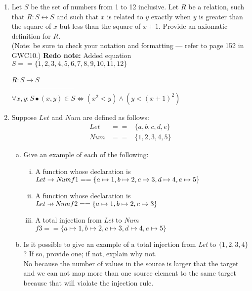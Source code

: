 \documentclass{article}
\renewcommand{\iff}{\Leftrightarrow}
\newcommand{\define}{==}
\begin{document}
\begin{enumerate}[\bf I.]
\begin{enumerate}[1.]
\item Let $S$ be the set of numbers from 1 to 12 inclusive. Let $R$ be a relation, such that
$R:S\leftrightarrow S$ and such that $x$ is related to $y$ exactly when
$y$ is greater than the square of $x$ but less than the square of
$x+1$. Provide an axiomatic definition for $R$. \\
(Note: be sure to check your notation and formatting --- refer to page 152 in GWC10.)
  \textbf{Redo note:} Added equation  \\
  $S == \{1,2,3,4,5,6,7,8,9,10,11,12\}$ \\
  \\
  $R: S \rightarrow S$ \\
  --------------------------- \\
  $\forall x,y:S \bullet(x,y) \in S \iff (x^2 < y) \land (y < (x + 1)^2)$ \\
  
\item Suppose $\mathit{Let}$ and $\mathit{Num}$ are defined as
follows:
\begin{eqnarray*}
\mathit{Let} & \define & \{a,b,c,d,e\}\\
\mathit{Num} & \define & \{1,2,3,4,5\}
\end{eqnarray*}
\begin{enumerate}[a.]
\item Give an example of each of the following:
\begin{enumerate}[i.]
\item A function whose declaration is $\mathit{Let\rightarrow Num} \\f1 == \{ a \mapsto 1, b \mapsto 2, c \mapsto 3, d \mapsto 4, e \mapsto 5 \}$
\item A function whose declaration is $\mathit{Let\rightarrow\!\!\!\!\shortmid ~Num} \\f2 == \{ a \mapsto 1, b \mapsto 2, c \mapsto 3\}$
\item A total injection from \emph{Let} to \emph{Num}\\
$f3 == \{ a \mapsto 1, b \mapsto 2, c \mapsto 3, d \mapsto 4, e \mapsto 5 \}$\\  
\end{enumerate}
\item Is it possible to give an example of a total injection from \emph{Let} to $\{1,2,3,4\}$? If so, provide one; if not, explain why not. \\
No because the number of values in the source is larger that the target and we can not map more than one source element to the same target because that will violate the injection rule. 


\end{enumerate}
\end{enumerate}
\end{enumerate}
\end{document}
